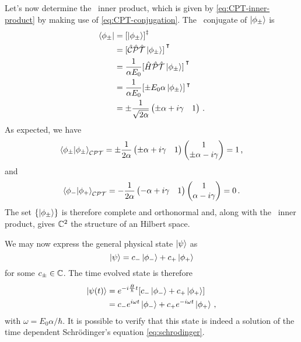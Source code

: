         Let's now determine the \CPT\ inner product, which is given by \eqref{eq:CPT-inner-product} by making use of \eqref{eq:CPT-conjugation}. The \CPT\ conjugate of $\ket{\phi_\pm}$ is
        \begin{align*}
            \bra{\phi_\pm}
            &= \bqty{\ket{\phi_\pm}}^\myconj \\
            &= \bqty*{\hCPT\ket{\phi_\pm}}^\intercal \\
            &= \frac{1}{\alpha E_0}\bqty*{\hH\hPT\ket{\phi_\pm}}^\intercal \\
            &= \frac{1}{\alpha E_0}\bqty*{\pm E_0 \alpha \ket{\phi_\pm}}^\intercal \\
            &= \pm\frac{1}{\sqrt{2\alpha}}\pmqty{\pm\alpha + i\gamma & 1}
            \myperiod
        \end{align*}
        As expected, we have
        \begin{equation}
            \braket{\phi_\pm}{\phi_\pm}_{\CPT} =  \pm\frac{1}{2\alpha}\pmqty{\pm\alpha + i\gamma & 1}\pmqty{1 \\ \pm\alpha - i \gamma} = 1
            \mycomma
        \end{equation}
        and
        \begin{equation}
            \braket{\phi_-}{\phi_+}_{\CPT} = -\frac{1}{2\alpha}\pmqty{-\alpha + i\gamma & 1}\pmqty{1 \\ \alpha - i \gamma} = 0
            \myperiod
        \end{equation}
        The set $\qty{\ket{\phi_\pm}}$ is therefore complete and orthonormal and, along with the \CPT\ inner product, gives $\mathbb{C}^2$ the structure of an Hilbert space.

        We may now express the general physical state $\ket{\psi}$ as 
        \begin{equation*}
            \ket{\psi} = c_{-}\ket{\phi_{-}} + c_{+}\ket{\phi_+}
        \end{equation*}
        for some $c_\pm\in\mathbb{C}$. The time evolved state is therefore
        \begin{align*}
            \ket{\psi\pqty{t}} 
            &= \myexp{-i\frac{\hH}{\hbar}t}\bqty*{c_{-}\ket{\phi_{-}} + c_{+}\ket{\phi_{+}}}\\
            &= c_{-}\myexp{i\omega t} \ket{\phi_{-}} + c_{+}\myexp{-i \omega t} \ket{\phi_{+}}
            \mycomma
        \end{align*}
        with $\omega = E_0 \alpha / \hbar$. It is possible to verify that this state is indeed a solution of the time dependent Schr\"odinger's equation \eqref{eq:schrodinger}.

